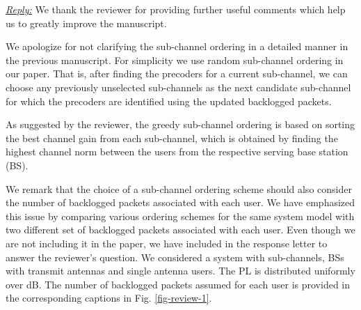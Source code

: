 
\vspace{1eM}
\underline{\textit{Reply:}} We thank the reviewer for providing further useful comments which help us to greatly improve the manuscript.

\begin{enumerate}

 

\resp We apologize for not clarifying the sub-channel ordering in a detailed manner in the previous manuscript. For simplicity we use random sub-channel ordering in our paper. That is, after finding the precoders for a current sub-channel, we can choose any previously unselected sub-channels as the next candidate sub-channel for which the precoders are identified using the updated backlogged packets. 

As suggested by the reviewer, the greedy sub-channel ordering is based on sorting the best channel gain from each sub-channel, which is obtained by finding the highest channel norm between the users from the respective serving base station (BS).  

We remark that the choice of a sub-channel ordering scheme should also consider the number of backlogged packets associated with each user. We have emphasized this issue by comparing various ordering schemes for the same system model with two different set of backlogged packets associated with each user. Even though we are not including it in the paper, we have included in the response letter to answer the reviewer's question. We considered a system with  sub-channels,  \acp{BS} with  transmit antennas and  single antenna users. The \ac{PL} is distributed uniformly over \eqn{[0,-3]} dB. The number of backlogged packets assumed for each user is provided in the corresponding captions in Fig. \ref{fig-review-1}.
\begin{figure*}[h!]
	\centering
	\hfill
	\caption{Convergence of the algorithms for  using  norm}
	\label{fig-review-1}
\end{figure*}


\end{enumerate}
